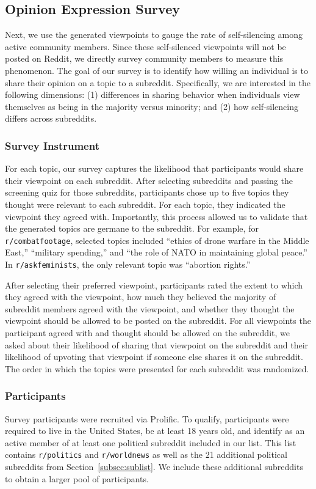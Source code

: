 \subsection{Opinion Expression Survey}
Next, we use the generated viewpoints to gauge the rate of self-silencing among active community members. Since these self-silenced viewpoints will not be posted on Reddit, we directly survey community members to measure this phenomenon. The goal of our survey is to identify how willing an individual is to share their opinion on a topic to a subreddit. Specifically, we are interested in the following dimensions: (1) differences in sharing behavior when individuals view themselves as being in the majority versus minority; and (2) how self-silencing differs across subreddits.


\subsubsection{Survey Instrument}
For each topic, our survey captures the likelihood that participants would share their viewpoint on each subreddit. After selecting subreddits and passing the screening quiz for those subreddits, participants chose up to five topics they thought were relevant to each subreddit. For each topic, they indicated the viewpoint they agreed with. Importantly, this process allowed us to validate that the generated topics are germane to the subreddit. For example, for \texttt{r/combatfootage}, selected topics included ``ethics of drone warfare in the Middle East,'' ``military spending,'' and ``the role of NATO in maintaining global peace.'' In \texttt{r/askfeminists}, the only relevant topic was ``abortion rights.''

After selecting their preferred viewpoint, participants rated the extent to which they agreed with the viewpoint, how much they believed the majority of subreddit members agreed with the viewpoint, and whether they thought the viewpoint should be allowed to be posted on the subreddit. For all viewpoints the participant agreed with and thought should be allowed on the subreddit, we asked about their likelihood of sharing that viewpoint on the subreddit and their likelihood of upvoting that viewpoint if someone else shares it on the subreddit. The order in which the topics were presented for each subreddit was randomized.

\subsubsection{Participants} 
Survey participants were recruited via Prolific. To qualify, participants were required to live in the United States, be at least 18 years old, and identify as an active member of at least one political subreddit included in our list. This list contains \texttt{r/politics} and \texttt{r/worldnews} as well as the 21 additional political subreddits from Section~\ref{subsec:sublist}. We include these additional subreddits to obtain a larger pool of participants.

